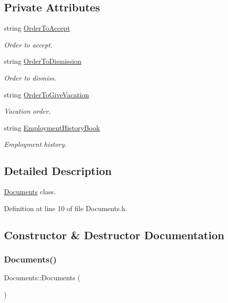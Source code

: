 \subsection*{Private Attributes}
\begin{DoxyCompactItemize}
\item 
string \hyperlink{class_documents_aeee4dc66716ab38efeae09702bc8feed}{Order\+To\+Accept}
\begin{DoxyCompactList}\small\item\em Order to accept. \end{DoxyCompactList}\item 
string \hyperlink{class_documents_a6d875e6e5ac48c55f9d9121ef302ac50}{Order\+To\+Dismission}
\begin{DoxyCompactList}\small\item\em Order to dismiss. \end{DoxyCompactList}\item 
string \hyperlink{class_documents_ad55168aa0283ea51d965e732d52bee5a}{Order\+To\+Give\+Vacation}
\begin{DoxyCompactList}\small\item\em Vacation order. \end{DoxyCompactList}\item 
string \hyperlink{class_documents_ab78a87bb29b653f803e657e6406905b4}{Employment\+History\+Book}
\begin{DoxyCompactList}\small\item\em Employment history. \end{DoxyCompactList}\end{DoxyCompactItemize}


\subsection{Detailed Description}
\hyperlink{class_documents}{Documents} class. 

Definition at line 10 of file Documents.\+h.



\subsection{Constructor \& Destructor Documentation}
\mbox{\label{class_documents_a52daba61782250a38f4964910a961793}} 
\subsubsection{\texorpdfstring{Documents()}{Documents()}}
{\footnotesize\ttfamily Documents\+::\+Documents (\begin{DoxyParamCaption}{ }\end{DoxyParamCaption})}



